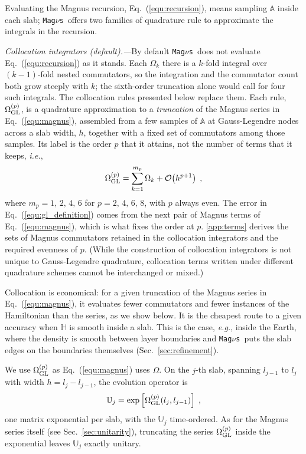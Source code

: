 \documentclass[final,5p,times,twocolumn,sort,compress]{elsarticle}
\makeatletter
\newcommand{\ie}{{\it i.e.}}
\newcommand{\eg}{{\it e.g.}}
\newcommand{\eq}{Eq.}
\DeclareRobustCommand{\_}{%
  \ifmmode\nfss@text{\textunderscore}\else\textunderscore\allowbreak\fi}
\newcommand{\equ}[1]{\eq~(\ref{equ:#1})}
\newcommand{\magnus}{{\tt Mag}\ensuremath{\nu}{\tt s}}
\makeatother
\begin{document}
Evaluating the Magnus recursion, \equ{recursion}, means sampling $\mathbb{A}$ inside each slab; \magnus\ offers two families of quadrature rule to approximate the integrals in the recursion.

\smallskip

\textit{Collocation integrators (default).---}By default \magnus\ does not evaluate \equ{recursion} as it stands. Each $\Omega_k$ there is a $k$-fold integral over $(k-1)$-fold nested commutators, so the integration and the commutator count both grow steeply with $k$; the sixth-order truncation alone would call for four such integrals. The collocation rules presented below replace them. Each rule, $\Omega_{\rm GL}^{(p)}$, is a quadrature approximation to a \emph{truncation} of the Magnus series in \equ{magnus}, assembled from a few samples of $\mathbb{A}$ at Gauss-Legendre nodes across a slab width, $h$, together with a fixed set of commutators among those samples. Its label is the order $p$ that it attains, not the number of terms that it keeps, \ie,
\begin{equation}
 \label{equ:gl_definition}
 \Omega_{\rm GL}^{(p)}
 =
 \sum_{k=1}^{m_p} \Omega_k + \mathcal{O}\!\left(h^{p+1}\right) \;,
\end{equation}
where $m_p = 1,\, 2,\, 4,\, 6$ for $p = 2,\, 4,\, 6,\, 8$, with $p$ always even. The error in \equ{gl_definition} comes from the next pair of Magnus terms of \equ{magnus}, which is what fixes the order at $p$.  \ref{app:terms} derives the sets of Magnus commutators retained in the collocation integrators and the required evenness of $p$.  (While the construction of collocation integrators is not unique to Gauss-Legendre quadrature, collocation terms written under different quadrature schemes cannot be interchanged or mixed.)

Collocation is economical: for a given truncation of the Magnus series in \equ{magnus}, it evaluates fewer commutators and fewer instances of the Hamiltonian than the series, as we show below. It is the cheapest route to a given accuracy when $\mathbb{H}$ is smooth inside a slab. This is the case, \eg, inside the Earth, where the density is smooth between layer boundaries and \magnus\ puts the slab edges on the boundaries themselves (Sec.~\ref{sec:refinement}).

We use $\Omega_{\rm GL}^{(p)}$ as \equ{magnus} uses $\Omega$. On the $j$-th slab, spanning $l_{j-1}$ to $l_j$ with width $h = l_j - l_{j-1}$, the evolution operator is
\begin{equation}
 \label{equ:slab_exponential}
 \mathbb{U}_j = \exp\left[\Omega_{\rm GL}^{(p)}(l_j, l_{j-1})\right] \;,
\end{equation}
one matrix exponential per slab, with the $\mathbb{U}_j$ time-ordered. As for the Magnus series itself (see Sec.~\ref{sec:unitarity}), truncating the series $\Omega_{\rm GL}^{(p)}$ inside the exponential leaves $\mathbb{U}_j$ exactly unitary.
\end{document}
